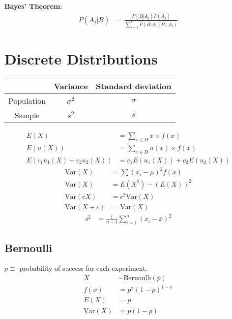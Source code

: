 \documentclass{article}
\newcommand{\var}{\text{Var}}
\newcommand{\bernoulli}{\text{Bernoulli}}
\begin{document}
\begin{multicols*}{2}
\textbf{Bayes' Theorem}:
\begin{align*}
    P(A_j|B) &= \frac{P(B|A_j) P(A_j)}{\sum_{i = 1}^k P(B|A_i) P(A_i)}
\end{align*}

\section{Discrete Distributions}

\begin{center}
    \begin{tabular}{|c|c|c|}
        \hline
                   & Variance   & Standard deviation \\ \hline
        Population & $\sigma^2$ & $\sigma$           \\ \hline
        Sample     & $s^2$      & $s$                \\ \hline
    \end{tabular}
\end{center}
\begin{align*}
    E(X) &= \sum_{x \in D} x \times f(x) \\
    E(u(X)) &= \sum_{x \in D} u(x) \times f(x) \\
    E(c_1 u_1(X) + c_2 u_2(X)) &= c_1 E(u_1(X)) + c_2 E(u_2(X))
\end{align*}
\begin{align*}
    \var(X) &= \sum (x_i - \mu)^2 f(x) \\
    \var(X) &= E(X^2) - (E(X))^2 \\
    \var(cX) &= c^2 \var(X) \\
    \var(X + c) &= \var(X)
\end{align*}
\begin{align*}
    s^2 &= \frac{1}{n - 1} \sum_{i = 1}^n (x_i - \bar{x})^2
\end{align*}

\subsection{Bernoulli}

$p \equiv$ probability of success for each experiment.
\begin{align*}
    X &\sim \bernoulli(p) \\
    f(x) &= p^x (1-p)^{1-x} \\
    E(X) &= p \\
    \var(X) &= p(1-p)
\end{align*}


\end{multicols*}
\end{document}
